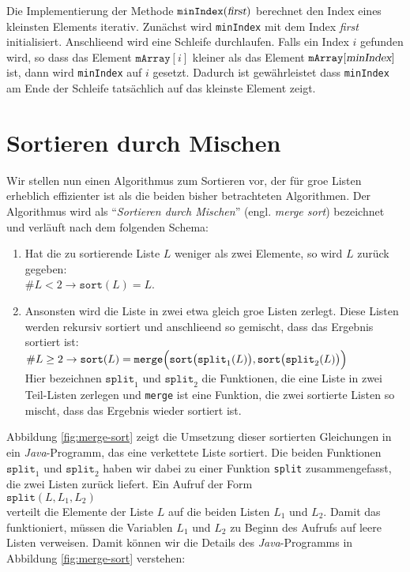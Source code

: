 Die Implementierung der Methode $\texttt{minIndex}(\textsl{first})$ berechnet den Index eines kleinsten
Elements iterativ.  Zun\"achst wird \texttt{minIndex} mit dem Index \textsl{first}
initialisiert.  Anschlie\3end wird eine Schleife durchlaufen.  Falls ein
Index $i$ gefunden wird, so dass das Element $\mathtt{mArray}[i]$ kleiner als das Element
$\texttt{mArray}[\textsl{minIndex}]$ ist, dann wird \texttt{minIndex} auf $i$ gesetzt.
Dadurch ist gew\"ahrleistet dass \texttt{minIndex} am Ende der Schleife tats\"achlich auf das
kleinste Element zeigt.
\pagebreak

\section{Sortieren durch Mischen}
Wir stellen nun einen Algorithmus zum Sortieren vor, der f\"ur gro\3e Listen erheblich
effizienter ist als die beiden bisher betrachteten Algorithmen.  Der Algorithmus wird als
``\emph{Sortieren durch Mischen}'' (engl. \emph{merge sort}) bezeichnet und verl\"auft nach dem folgenden Schema:
\begin{enumerate}
\item Hat die zu sortierende Liste $L$ weniger als zwei Elemente, so wird $L$ zur\"uck
      gegeben: \\[0.1cm]
      \hspace*{1.3cm} $\#L < 2 \rightarrow \mathtt{sort}(L) = L$.
\item Ansonsten wird die Liste in zwei etwa gleich gro\3e Listen zerlegt.
      Diese Listen werden rekursiv sortiert und anschlie\3end so gemischt, dass
      das Ergebnis sortiert ist: \\[0.1cm]
      \hspace*{1.3cm} 
 $\#L \geq 2 \rightarrow \mathtt{sort}(L) = \mathtt{merge}\Bigl(\mathtt{sort}\bigl(\mathtt{split}_1(L)\bigr), \mathtt{sort}\bigl(\mathtt{split}_2(L)\bigr)\Bigr)$
     \\[0.1cm]
     Hier bezeichnen $\texttt{split}_1$ und $\mathtt{split}_2$ die Funktionen, die eine Liste in zwei Teil-Listen zerlegen
     und \texttt{merge} ist eine Funktion, die zwei sortierte Listen so mischt, dass das Ergebnis wieder sortiert ist.
\end{enumerate}
Abbildung \ref{fig:merge-sort} zeigt die Umsetzung dieser sortierten Gleichungen 
in ein \textsl{Java}-Programm, das eine verkettete Liste sortiert. 
Die beiden Funktionen $\mathtt{split}_1$ und $\mathtt{split}_2$ haben wir dabei
zu einer Funktion \texttt{split} zusammengefasst, die zwei Listen zur\"uck liefert. Ein
Aufruf der Form
\\[0.2cm]
\hspace*{1.3cm}
$\mathtt{split}(L, L_1, L_2)$
\\[0.2cm]
verteilt die Elemente der Liste $L$ auf die beiden Listen $L_1$ und $L_2$.  
Damit das funktioniert, m\"ussen die Variablen $L_1$ und $L_2$ zu Beginn des Aufrufs auf
leere Listen verweisen.  Damit k\"onnen wir die Details des \textsl{Java}-Programms in
Abbildung \ref{fig:merge-sort} verstehen:


